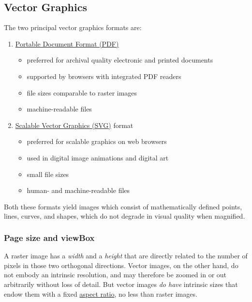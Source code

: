 \documentclass[
  12pt,
  british,
  a4paper,
  rgb,
  dvipsnames,
  svgnames,
  hyphens]{article}
\providecommand{\tightlist}{%
  \setlength{\itemsep}{0pt}\setlength{\parskip}{0pt}}
\begin{document}
\hypertarget{vector-graphics}{%
\subsection{Vector Graphics}\label{vector-graphics}}

The two principal vector graphics formats are:

\begin{enumerate}
\tightlist
\item
  \href{https://en.wikipedia.org/wiki/PDF}{Portable Document Format
  (PDF)}

  \begin{itemize}
  \tightlist
  \item
    preferred for archival quality electronic and printed documents
  \item
    supported by browsers with integrated PDF readers
  \item
    file sizes comparable to raster images
  \item
    machine-readable files
  \end{itemize}
\item
  \href{https://en.wikipedia.org/wiki/Scalable_Vector_Graphics}{Scalable
  Vector Graphics (SVG)} format

  \begin{itemize}
  \tightlist
  \item
    preferred for scalable graphics on web browsers
  \item
    used in digital image animations and digital art
  \item
    small file sizes
  \item
    human- and machine-readable files
  \end{itemize}
\end{enumerate}

Both these formats yield images which consist of mathematically defined
points, lines, curves, and shapes, which do not degrade in visual
quality when magnified.

\hypertarget{page-size-and-viewbox}{%
\subsubsection{Page size and viewBox}\label{page-size-and-viewbox}}

A raster image has a \emph{width} and a \emph{height} that are directly
related to the number of pixels in those two orthogonal directions.
Vector images, on the other hand, do not embody an intrinsic resolution,
and may therefore be zoomed in or out arbitrarily without loss of
detail. But vector images \emph{do have} intrinsic sizes that endow them
with a fixed \href{https://en.wikipedia.org/wiki/Aspect_ratio}{aspect
ratio}, no less than raster images.
\end{document}
